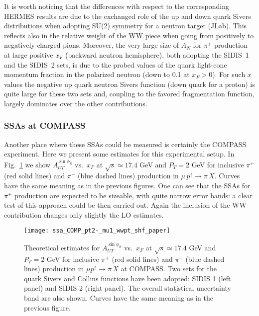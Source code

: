 \documentclass[nofootinbib,superscriptaddress,aps]{revtex4}
\begin{document}
It is worth noticing that the differences with respect to the corresponding HERMES results are due to the exchanged role of the up and down quark Sivers distributions when adopting SU(2) symmetry for a neutron target (JLab). This reflects also in the relative weight of the WW piece when going from positively to negatively charged pions. Moreover, the very large size of $A_N$ for $\pi^+$ production at large positive $x_F$ (backward neutron hemisphere), both adopting the SIDIS~1 and the SIDIS~2 sets, is due to the probed values of the quark light-cone momentum fraction in the polarized neutron (down to 0.1 at $x_F>0$). For such $x$ values the negative up quark neutron Sivers function (down quark for a proton) is quite large for these two sets and, coupling to the favored fragmentation function, largely dominates over the other contributions.



\subsubsection{SSAs at COMPASS}

Another place where these SSAs could be measured is certainly the COMPASS experiment. Here we present some estimates for this experimental setup. In Fig.~\ref{fig:SSA-comp-pi-pt2} we show $A_{UT}^{\sin\phi_S}$ vs.~$x_F$ at $\sqrt{s}\simeq 17.4$ GeV and $P_T = 2$ GeV for inclusive $\pi^+$ (red solid lines) and $\pi^-$ (blue dashed lines) production in $\mu \, p^\uparrow\to \pi\, X$. Curves have the same meaning as in the previous figures. One can see that the SSAs for $\pi^+$ production are expected to be sizeable, with quite narrow error bands: a clear test of this approach could be then carried out. Again the inclusion of the WW contribution changes only slightly the LO estimates.

\begin{figure}[ht!]
 \centering
 \texttt{[image: ssa\_COMP\_pt2-\_mu1\_wwpt\_shf\_paper]}
 \caption{Theoretical estimates for $A_{UT}^{\sin\phi_S}$ vs.~$x_F$ at $\sqrt{s}\simeq 17.4$ GeV and $P_T = 2$ GeV for inclusive $\pi^+$ (red solid lines) and $\pi^-$ (blue dashed lines) production in $\mu p^\uparrow\to \pi\, X$ at COMPASS. Two sets for the quark Sivers and Collins functions have been adopted: SIDIS 1 (left panel) and SIDIS 2 (right panel). The overall statistical uncertainty band are also shown. Curves have the same meaning as in the previous figure.
}
  \label{fig:SSA-comp-pi-pt2}
\end{figure}
\end{document}
